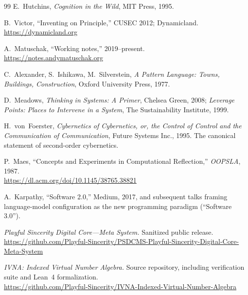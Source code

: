 \documentclass[12pt]{article}
\begin{document}
\begin{thebibliography}{99}
E.~Hutchins, \emph{Cognition in the Wild}, MIT Press, 1995.

B.~Victor, ``Inventing on Principle,'' CUSEC 2012; Dynamicland. \\
\url{https://dynamicland.org}

A.~Matuschak, ``Working notes,'' 2019--present. \\
\url{https://notes.andymatuschak.org}


C.~Alexander, S.~Ishikawa, M.~Silverstein, \emph{A Pattern Language: Towns, Buildings, Construction}, Oxford University Press, 1977.

D.~Meadows, \emph{Thinking in Systems: A Primer}, Chelsea Green, 2008; \emph{Leverage Points: Places to Intervene in a System}, The Sustainability Institute, 1999.

H.~von~Foerster, \emph{Cybernetics of Cybernetics, or, the Control of Control and the Communication of Communication}, Future Systems Inc., 1995. The canonical statement of second-order cybernetics.

P.~Maes, ``Concepts and Experiments in Computational Reflection,'' \emph{OOPSLA}, 1987. \\
\url{https://dl.acm.org/doi/10.1145/38765.38821}

A.~Karpathy, ``Software 2.0,'' Medium, 2017, and subsequent talks framing language-model configuration as the new programming paradigm (``Software 3.0'').


\emph{Playful Sincerity Digital Core---Meta System.} Sanitized public release. \\
\url{https://github.com/Playful-Sincerity/PSDCMS-Playful-Sincerity-Digital-Core-Meta-System}

\emph{IVNA: Indexed Virtual Number Algebra.} Source repository, including verification suite and Lean~4 formalization. \\
\url{https://github.com/Playful-Sincerity/IVNA-Indexed-Virtual-Number-Algebra}

\end{thebibliography}
\end{document}
